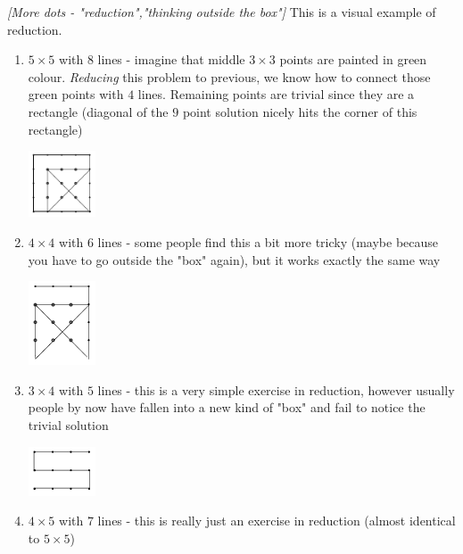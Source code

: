 \begin{problem}
\textit{[More dots - "reduction","thinking outside the box"]}
This is a visual example of reduction. 
\begin{enumerate}
\item $5 \times 5$ with $8$ lines  - imagine that middle $3 \times 3$ points are painted in green colour. \textit{Reducing} this problem to previous, we know how to connect those green points with $4$ lines. Remaining points are trivial since they are a rectangle (diagonal of the $9$ point solution nicely hits the corner of this rectangle)
\begin{center}
\includegraphics[width=2cm]{5by5Solved.png}
\end{center}
\item $4 \times 4$ with $6$ lines - some people find this a bit more tricky (maybe because you have to go outside the "box" again), but it works exactly the same way
\begin{center}
\includegraphics[width=2cm]{4by4Solved.png}
\end{center}
\item $3 \times 4$ with $5$ lines - this is a very simple exercise in reduction, however usually people by now have fallen into a new kind of "box" and fail to notice the trivial solution
\begin{center}
\includegraphics[width=2cm]{3by4Solved.png}
\end{center}
\item $4 \times 5$ with $7$ lines - this is really just an exercise in reduction (almost identical to $5 \times 5$)
\end{enumerate}
\end{problem}
